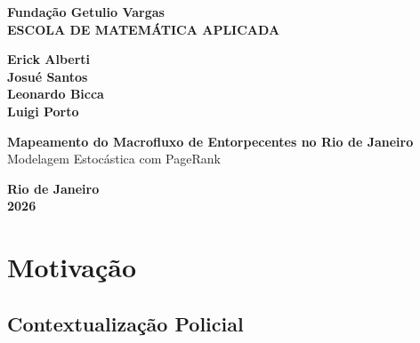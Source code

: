\documentclass[english,portuguese,10pt,a4paper]{article}
\begin{document}
	\begin{titlepage}
		\begin{center}
			\vspace*{1cm} 
			\textbf{\Large Fundação Getulio Vargas} \\
			\textbf{\large ESCOLA DE MATEMÁTICA APLICADA}
			
			\vspace{3cm}
			
			\textbf{\large Erick Alberti} \\
			\textbf{\large Josué Santos} \\
			\textbf{\large Leonardo Bicca} \\
			\textbf{\large Luigi Porto}
			
			\vspace{4cm}
			
			\textbf{\LARGE Mapeamento do Macrofluxo de Entorpecentes no Rio
				de Janeiro
			} \\
			\vspace{0.5cm}
			\Large Modelagem Estocástica com PageRank
			
			\vspace{2cm}
			
			\vfill 
			
			\textbf{\large Rio de Janeiro} \\
			\textbf{\large 2026}
		\end{center}
	\end{titlepage}
	
	\begin{abstract}
		\lipsum[1-2] 
	\end{abstract}
	
	\vspace{1cm}
	
	\begin{otherlanguage}{english} 
		\begin{abstract}
			\lipsum[3-4] 
		\end{abstract}	
	\end{otherlanguage}
	
	\newpage
	
	\tableofcontents
	\newpage
	
	\section{Motivação}
	\lipsum[1-10]
	\newpage
	\subsection{Contextualização Policial}
	\lipsum[1-10]
	\newpage
\end{document}
